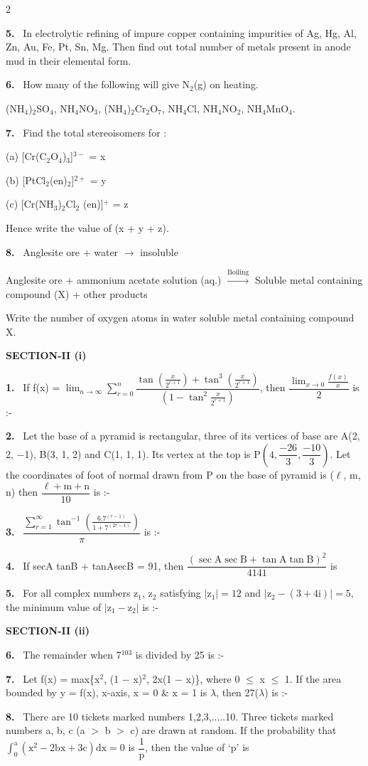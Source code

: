 \documentclass[10pt]{extarticle}
\newcommand{\papersec}[1]{\par\bigskip{\centering\Large\bfseries PAPER-#1\par}\medskip}
\newcommand{\partsec}[2]{\par\medskip\noindent{\large\bfseries PART-#1: #2}\par\smallskip}
\newcommand{\sect}[1]{\par\smallskip\noindent\textbf{#1}\par}
\newcommand{\qn}[1]{\par\smallskip\noindent\textbf{#1.}~}
\begin{document}
\begin{multicols}{2}
\qn{5} In electrolytic refining of impure copper containing impurities of Ag, Hg, Al, Zn, Au, Fe, Pt, Sn, Mg. Then find out total number of metals present in anode mud in their elemental form.
\qn{6} How many of the following will give N$_2$(g) on heating.\par
(NH$_4$)$_2$SO$_4$, NH$_4$NO$_3$, (NH$_4$)$_2$Cr$_2$O$_7$, NH$_4$Cl, NH$_4$NO$_2$, NH$_4$MnO$_4$.
\qn{7} Find the total stereoisomers for :\par
(a) [Cr(C$_2$O$_4$)$_3$]$^{3-}$ = x\par
(b) [PtCl$_2$(en)$_2$]$^{2+}$ = y\par
(c) [Cr(NH$_3$)$_2$Cl$_2$ (en)]$^+$ = z\par
Hence write the value of (x + y + z).
\qn{8} Anglesite ore + water $\rightarrow$ insoluble\par
Anglesite ore + ammonium acetate solution (aq.) $\xrightarrow{\text{Boiling}}$ Soluble metal containing compound (X) + other products\par
Write the number of oxygen atoms in water soluble metal containing compound X.
\raggedcolumns
\papersec{1}
\partsec{3}{MATHEMATICS}
\sect{SECTION-II (i)}
\qn{1} If f(x) = $\displaystyle\lim_{n\to\infty}\sum_{r=0}^{n}\dfrac{\tan\left(\frac{x}{2^{r+1}}\right)+\tan^3\left(\frac{x}{2^{r+1}}\right)}{\left(1-\tan^2\frac{x}{2^{r+1}}\right)}$, then $\dfrac{\displaystyle\lim_{x\to0}\frac{f(x)}{x}}{2}$ is :-
\qn{2} Let the base of a pyramid is rectangular, three of its vertices of base are A(2, 2, $-$1), B(3, 1, 2) and C(1, 1, 1). Its vertex at the top is P$\left(4,\dfrac{-26}3,\dfrac{-10}3\right)$. Let the coordinates of foot of normal drawn from P on the base of pyramid is ($\ell$, m, n) then $\dfrac{\ell+\mathrm m+\mathrm n}{10}$ is :-
\qn{3} $\dfrac{\displaystyle\sum_{r=1}^{\infty}\tan^{-1}\left(\frac{6.7^{(r-1)}}{1+7^{(2r-1)}}\right)}{\pi}$ is :-
\qn{4} If secA tanB + tanAsecB = 91, then $\dfrac{(\sec\mathrm A\sec\mathrm B+\tan\mathrm A\tan\mathrm B)^2}{4141}$ is
\qn{5} For all complex numbers z$_1$, z$_2$ satisfying $|\mathrm z_1|=12$ and $|\mathrm z_2-(3+4\mathrm i)|=5$, the minimum value of $|\mathrm z_1-\mathrm z_2|$ is :-
\sect{SECTION-II (ii)}
\qn{6} The remainder when 7$^{103}$ is divided by 25 is :-
\qn{7} Let f(x) = max\{x$^2$, (1 $-$ x)$^2$, 2x(1 $-$ x)\}, where 0 $\le$ x $\le$ 1. If the area bounded by y = f(x), x-axis, x = 0 \& x = 1 is $\lambda$, then 27($\lambda$) is :-
\qn{8} There are 10 tickets marked numbers 1,2,3,.....10. Three tickets marked numbers a, b, c (a $>$ b $>$ c) are drawn at random. If the probability that $\displaystyle\int_0^{\mathrm a}\left(\mathrm x^2-2\mathrm{bx}+3\mathrm c\right)\mathrm{dx}=0$ is $\dfrac1{\mathrm p}$, then the value of `p' is

\end{multicols}
\end{document}
